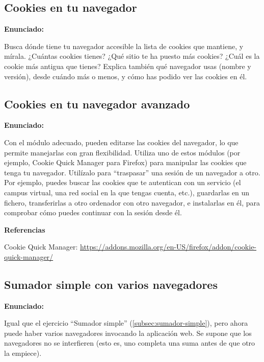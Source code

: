 \subsection{Cookies en tu navegador}
\label{subsec:cookies-navegador}

\textbf{Enunciado:}

Busca dónde tiene tu navegador accesible la lista de cookies que mantiene, y mírala. ¿Cuántas cookies tienes? ¿Qué sitio te ha puesto más cookies? ¿Cuál es la cookie más antigua que tienes? Explica también qué navegador usas (nombre y versión), desde cuándo más o menos, y cómo has podido ver las cookies en él.


\subsection{Cookies en tu navegador avanzado}
\label{subsec:cookies-navegador-2}

\textbf{Enunciado:}

Con el módulo adecuado, pueden editarse las cookies del navegador, lo que permite manejarlas con gran flexibilidad. Utiliza uno de estos módulos (por ejemplo, Cookie Quick Manager para Firefox) para manipular las cookies que tenga tu navegador. Utilízalo para ``traspasar'' una sesión de un navegador a otro. Por ejemplo, puedes buscar las cookies que te autentican con un servicio (el campus virtual, una red social en la que tengas cuenta, etc.), guardarlas en un fichero, transferirlas a otro ordenador con otro navegador, e instalarlas en él, para comprobar cómo puedes continuar con la sesión desde él.

\textbf{Referencias}

Cookie Quick Manager: \url{https://addons.mozilla.org/en-US/firefox/addon/cookie-quick-manager/}


\subsection{Sumador simple con varios navegadores}
\label{subsec:sumador-simple-varios}

\textbf{Enunciado:}

Igual que el ejercicio ``Sumador simple'' (\ref{subsec:sumador-simple}), pero ahora puede haber varios navegadores invocando la aplicación web. Se supone que los navegadores no se interfieren (esto es, uno completa una suma antes de que otro la empiece).

